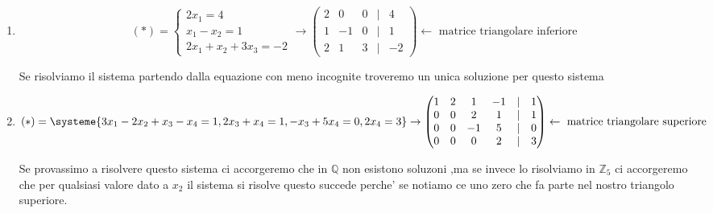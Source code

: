 \documentclass{article}
\begin{document}
\begin{enumerate}
  \item \begin{equation*}
      (*)=
      \begin{cases}
        2x_1=4 \\ 
        x_1-x_2=1 \\ 
        2x_1+x_2+3x_3=-2
      \end{cases} \to 
      \begin{pmatrix}
        2 & 0 & 0 & | & 4\\
        1 &  -1& 0 & | & 1\\
        2 &  1& 3 & | & -2
      \end{pmatrix}\leftarrow \text{ matrice triangolare inferiore }
  \end{equation*}
  \begin{flushleft}
    Se risolviamo il sistema partendo dalla equazione con meno incognite troveremo un unica soluzione per questo sistema
  \end{flushleft}
\item \begin{equation*}
    (*)=\systeme{
      3x_1-2x_2+x_3-x_4=1,
      2x_3+x_4=1,
      -x_3+5x_4=0,
      2x_4=3
    }\to\begin{pmatrix}
      1 & 2 & 1& -1& |& 1 \\
      0 & 0 & 2& 1& |& 1 \\
      0 & 0 & -1& 5& |& 0 \\
      0 & 0 & 0& 2& |& 3
    \end{pmatrix}\leftarrow \text{ matrice triangolare superiore }
\end{equation*}
\begin{flushleft}
  Se provassimo a risolvere questo sistema ci accorgeremo che in $\mathbb{Q}$ non esistono soluzoni
  ,ma se invece lo risolviamo in $\mathbb{Z}_5$ ci accorgeremo che per qualsiasi valore dato a $x_2$ il sistema si risolve 
  questo succede perche' se notiamo ce uno zero che fa parte nel nostro triangolo superiore.
\end{flushleft}
\end{enumerate}
\end{document}
